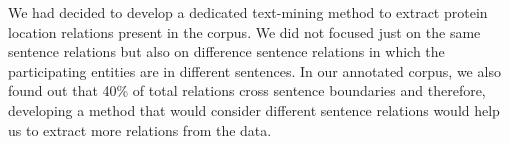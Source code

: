 We had decided to develop a dedicated text-mining method to extract protein location relations present in the corpus. We did not focused just on the same sentence relations but also on difference sentence relations in which the participating entities are in different sentences. In our annotated corpus, we also found out that 40\% of total relations cross sentence boundaries and therefore, developing a method that would consider different sentence relations would help us to extract more relations from the data.




















